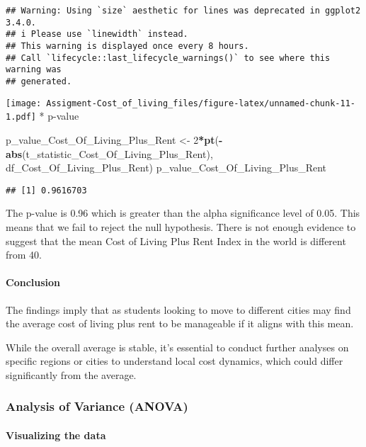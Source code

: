 \documentclass[
]{article}
\newenvironment{Shaded}{\begin{snugshade}}{\end{snugshade}}
\newcommand{\DecValTok}[1]{\textcolor[rgb]{0.00,0.00,0.81}{#1}}
\newcommand{\FunctionTok}[1]{\textcolor[rgb]{0.13,0.29,0.53}{\textbf{#1}}}
\newcommand{\NormalTok}[1]{#1}
\newcommand{\OtherTok}[1]{\textcolor[rgb]{0.56,0.35,0.01}{#1}}
\newcommand{\SpecialCharTok}[1]{\textcolor[rgb]{0.81,0.36,0.00}{\textbf{#1}}}
\begin{document}
\begin{verbatim}
## Warning: Using `size` aesthetic for lines was deprecated in ggplot2 3.4.0.
## i Please use `linewidth` instead.
## This warning is displayed once every 8 hours.
## Call `lifecycle::last_lifecycle_warnings()` to see where this warning was
## generated.
\end{verbatim}

\texttt{[image: Assigment-Cost\_of\_living\_files/figure-latex/unnamed-chunk-11-1.pdf]}
* p-value

\begin{Shaded}
\begin{Highlighting}[]
\NormalTok{p\_value\_Cost\_Of\_Living\_Plus\_Rent }\OtherTok{\textless{}{-}} \DecValTok{2}\SpecialCharTok{*}\FunctionTok{pt}\NormalTok{(}\SpecialCharTok{{-}}\FunctionTok{abs}\NormalTok{(t\_statistic\_Cost\_Of\_Living\_Plus\_Rent), df\_Cost\_Of\_Living\_Plus\_Rent)}
\NormalTok{p\_value\_Cost\_Of\_Living\_Plus\_Rent}
\end{Highlighting}
\end{Shaded}

\begin{verbatim}
## [1] 0.9616703
\end{verbatim}

The p-value is 0.96 which is greater than the alpha significance level
of 0.05. This means that we fail to reject the null hypothesis. There is
not enough evidence to suggest that the mean Cost of Living Plus Rent
Index in the world is different from 40.

\paragraph{Conclusion}\label{conclusion}

The findings imply that as students looking to move to different cities
may find the average cost of living plus rent to be manageable if it
aligns with this mean.

While the overall average is stable, it's essential to conduct further
analyses on specific regions or cities to understand local cost
dynamics, which could differ significantly from the average.

\subsubsection{Analysis of Variance
(ANOVA)}\label{analysis-of-variance-anova}

\paragraph{Visualizing the data}\label{visualizing-the-data}
\end{document}
